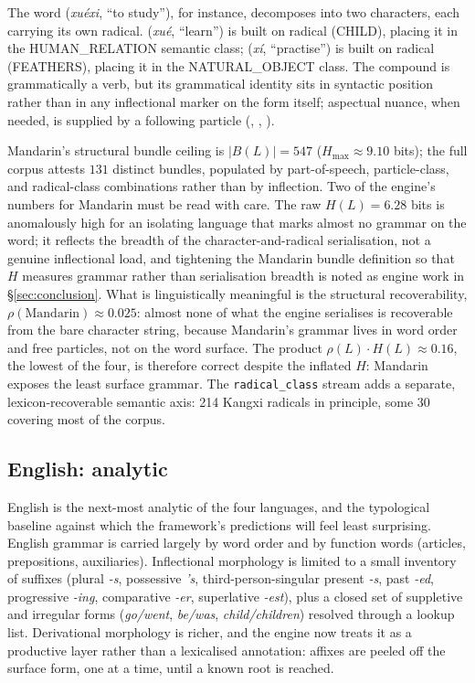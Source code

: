 The word  (\emph{xu\'exi}, ``to study''), for instance, decomposes into two characters, each carrying its own radical.  (\emph{xu\'e}, ``learn'') is built on radical  (CHILD), placing it in the HUMAN\_RELATION semantic class;  (\emph{x\'i}, ``practise'') is built on radical  (FEATHERS), placing it in the NATURAL\_OBJECT class. The compound is grammatically a verb, but its grammatical identity sits in syntactic position rather than in any inflectional marker on the form itself; aspectual nuance, when needed, is supplied by a following particle (, , ).

Mandarin's structural bundle ceiling is $|B(L)| = 547$ ($H_{\max} \approx 9.10$ bits); the full corpus attests $131$ distinct bundles, populated by part-of-speech, particle-class, and radical-class combinations rather than by inflection. Two of the engine's numbers for Mandarin must be read with care. The raw $H(L) = 6.28$ bits is anomalously high for an isolating language that marks almost no grammar on the word; it reflects the breadth of the character-and-radical serialisation, not a genuine inflectional load, and tightening the Mandarin bundle definition so that $H$ measures grammar rather than serialisation breadth is noted as engine work in \S\ref{sec:conclusion}. What is linguistically meaningful is the structural recoverability, $\rho(\text{Mandarin}) \approx 0.025$: almost none of what the engine serialises is recoverable from the bare character string, because Mandarin's grammar lives in word order and free particles, not on the word surface. The product $\rho(L)\cdot H(L) \approx 0.16$, the lowest of the four, is therefore correct despite the inflated $H$: Mandarin exposes the least surface grammar. The \texttt{radical\_class} stream adds a separate, lexicon-recoverable semantic axis: 214 Kangxi radicals in principle, some 30 covering most of the corpus.

\subsection{English: analytic}
\label{sec:cases-en}

English is the next-most analytic of the four languages, and the typological baseline against which the framework's predictions will feel least surprising. English grammar is carried largely by word order and by function words (articles, prepositions, auxiliaries). Inflectional morphology is limited to a small inventory of suffixes (plural \emph{-s}, possessive \emph{'s}, third-person-singular present \emph{-s}, past \emph{-ed}, progressive \emph{-ing}, comparative \emph{-er}, superlative \emph{-est}), plus a closed set of suppletive and irregular forms (\emph{go/went}, \emph{be/was}, \emph{child/children}) resolved through a lookup list. Derivational morphology is richer, and the engine now treats it as a productive layer rather than a lexicalised annotation: affixes are peeled off the surface form, one at a time, until a known root is reached.

